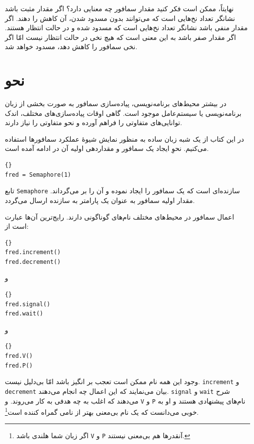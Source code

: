 \documentclass{book}
\begin{document}
    نهایتاً، ممکن است فکر کنید مقدار سمافور چه معنایی دارد؟ 
    اگر مقدار مثبت باشد نشانگر تعداد نخ‌هایی است که می‌توانند بدون مسدود شدن، آن کاهش را دهند.
    اگر مقدار منفی باشد نشانگر تعداد نخ‌هایی است که مسدود شده و در حالت انتظار هستند. 
    اگر مقدار صفر باشد به این معنی است که هیچ نخی در حالت انتظار نیست امّا اگر نخی سمافور را کاهش دهد، مسدود خواهد شد.
    

\section{نحو}

    در بیشتر محیط‌های برنامه‌نویسی، پیاده‌سازی سمافور به صورت بخشی از زبان برنامه‌نویسی یا سیستم‌عامل موجود است. 
    گاهی اوقات پیاده‌سازی‌های مختلف،‌ اندک توانایی‌های متفاوتی را فراهم آورده و نحو متفاوتی را نیاز دارند.

    در این کتاب از یک شبه زبان ساده به منظور نمایش شیوهٔ عملکرد سمافورها استفاده می‌کنیم. 
    نحوِ ایجاد یک سمافور و مقداردهی اولیه آن در ادامه آمده است.
%
\begin{latin}
\begin{lstlisting}[title=\rl{نحوِ مقداردهی اولیه سمافور}]{}
fred = Semaphore(1)
\end{lstlisting}
\end{latin}
%
    تابع \texttt{Semaphore} سازنده‌ای است که یک سمافور را ایجاد نموده 
    و آن را بر می‌گرداند. مقدار اولیه سمافور به عنوان یک پارامتر به سازنده ارسال می‌گردد. 

    اعمال سمافور در محیط‌های مختلف نام‌های گوناگونی دارند. رایج‌ترین آن‌ها عبارت است از:
%
\begin{latin}
\begin{lstlisting}[title=\rl{اعمال سمافور}]{}
fred.increment()
fred.decrement()	
\end{lstlisting}
\end{latin}
%
و
%
\begin{latin}
\begin{lstlisting}[title=\rl{اعمال سمافور}]{}
fred.signal()
fred.wait()	
\end{lstlisting}
\end{latin}
%
و
%
\begin{latin}
\begin{lstlisting}[title=\rl{اعمال سمافور}]{}
fred.V()
fred.P()	
\end{lstlisting}
\end{latin}
%
    وجود این همه نام ممکن است تعجب بر انگیز باشد امّا بی‌دلیل نیست. 
    \texttt{increment} و \texttt{decrement}
    بیان می‌نمایند که این اعمال چه انجام می‌دهند. 
    \texttt{signal} و \texttt{wait}
    شرح می‌دهند که اغلب به چه هدفی به کار می‌روند. و
    \texttt{V} و \texttt{P}
    نام‌های پیشنهادی  هستند و او به خوبی می‌دانست که یک نام بی‌معنی بهتر از نامی گمراه کننده است\footnote{%
    اگر زبان شما هلندی باشد \texttt{V} و \texttt{P} آنقدرها هم بی‌معنی نیستند.}. 
\end{document}
